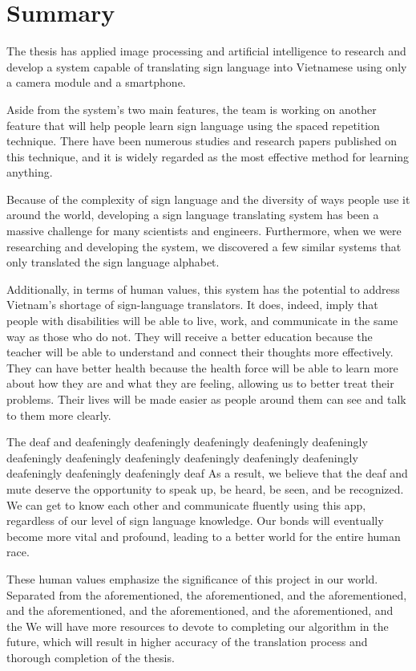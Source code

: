 \chapter{Summary}

The thesis has applied image processing and artificial intelligence to research and develop a system capable of translating sign language into Vietnamese using only a camera module and a smartphone.

Aside from the system's two main features, the team is working on another feature that will help people learn sign language using the spaced repetition technique. There have been numerous studies and research papers published on this technique, and it is widely regarded as the most effective method for learning anything.

Because of the complexity of sign language and the diversity of ways people use it around the world, developing a sign language translating system has been a massive challenge for many scientists and engineers. Furthermore, when we were researching and developing the system, we discovered a few similar systems that only translated the sign language alphabet.

Additionally, in terms of human values, this system has the potential to address Vietnam's shortage of sign-language translators. It does, indeed, imply that people with disabilities will be able to live, work, and communicate in the same way as those who do not. They will receive a better education because the teacher will be able to understand and connect their thoughts more effectively. They can have better health because the health force will be able to learn more about how they are and what they are feeling, allowing us to better treat their problems. Their lives will be made easier as people around them can see and talk to them more clearly.

The deaf and deafeningly deafeningly deafeningly deafeningly deafeningly deafeningly deafeningly deafeningly deafeningly deafeningly deafeningly deafeningly deafeningly deafeningly deaf As a result, we believe that the deaf and mute deserve the opportunity to speak up, be heard, be seen, and be recognized. We can get to know each other and communicate fluently using this app, regardless of our level of sign language knowledge. Our bonds will eventually become more vital and profound, leading to a better world for the entire human race.

These human values emphasize the significance of this project in our world. Separated from the aforementioned, the aforementioned, and the aforementioned, and the aforementioned, and the aforementioned, and the aforementioned, and the We will have more resources to devote to completing our algorithm in the future, which will result in higher accuracy of the translation process and thorough completion of the thesis.
